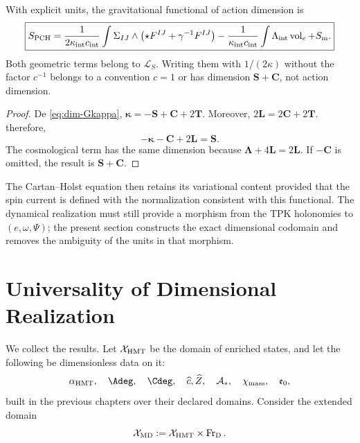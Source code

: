 \begin{theorem}
\label{thm:homogeneidad-pch}
With explicit units, the gravitational functional of action dimension is
\[
 \boxed{
 S_{\rm PCH}
 =\frac1{2\kappa_{\rm int}c_{\rm int}}
 \int\Sigma_{IJ}\wedge
 \left(\star F^{IJ}+\gamma^{-1}F^{IJ}\right)
 -\frac1{\kappa_{\rm int}c_{\rm int}}
 \int\Lambda_{\rm int}\operatorname{vol}_e
 +S_{\rm m}.}
 \]
Both geometric terms belong to \(\mathcal L_S\). Writing them with
\(1/(2\kappa)\) without the factor \(c^{-1}\) belongs to a convention
\(c=1\) or has dimension \(\mathbf S+\mathbf C\), not action dimension.
\end{theorem}

\begin{proof}
De \eqref{eq:dim-Gkappa},
\(\boldsymbol\kappa=-\mathbf S+\mathbf C+2\mathbf T\). Moreover,
\(2\mathbf L=2\mathbf C+2\mathbf T\). therefore,
\[
 -\boldsymbol\kappa-\mathbf C+2\mathbf L
 =\mathbf S.
\]
The cosmological term has the same dimension because
\(\boldsymbol\Lambda+4\mathbf L=2\mathbf L\). If
\(-\mathbf C\) is omitted, the result is \(\mathbf S+\mathbf C\).
\end{proof}

The Cartan--Holst equation then retains its variational content
provided that the spin current is defined with the normalization consistent
with this functional. The dynamical realization must still provide a
morphism from the TPK holonomies to \((e,\omega,\Psi)\); the present
section constructs the exact dimensional codomain and removes the ambiguity of
the units in that morphism.

\section{Universality of Dimensional Realization}

We collect the results. Let \(\mathcal X_{\rm HMT}\) be the domain of enriched
states, and let the following be dimensionless data on it:
\[
 \alpha_{\rm HMT},\quad \Adeg,\quad\Cdeg,\quad
 \widehat c,\widehat Z,\quad
 \mathcal A_*,\quad\chi_{\rm mass},\quad\mathfrak e_0,
\]
built in the previous chapters over their declared domains.
Consider the extended domain
\[
 \mathcal X_{\rm MD}
 :=\mathcal X_{\rm HMT}\times\operatorname{Fr}_{\rm D}.
\]

